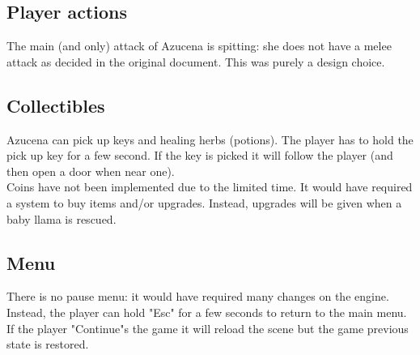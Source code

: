 \documentclass[10pt, a4paper]{article}
\begin{document}
    \subsection{Player actions}
    The main (and only) attack of Azucena is spitting: she does not have a melee attack as decided in the original document. This was purely a design choice.
    
    \subsection{Collectibles}
    Azucena can pick up keys and healing herbs (potions). The player has to hold the pick up key for a few second. If the key is picked it will follow the player (and then open a door when near one).\\
    Coins have not been implemented due to the limited time. It would have required a system to buy items and/or upgrades. Instead, upgrades will be given when a baby llama is rescued.
    
    \subsection{Menu}
    There is no pause menu: it would have required many changes on the engine. Instead, the player can hold "Esc" for a few seconds to return to the main menu. If the player "Continue"s the game it will reload the scene but the game previous state is restored.
    
\end{document}
